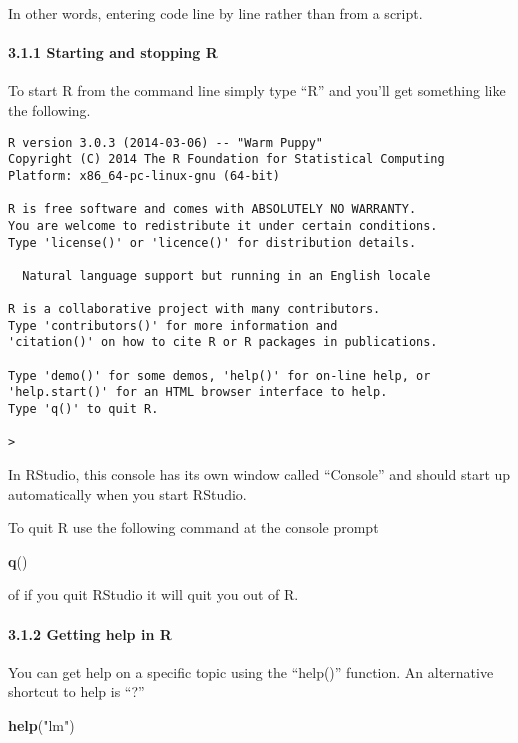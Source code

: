 \documentclass[]{article}
\newenvironment{Shaded}{}{}
\newcommand{\KeywordTok}[1]{\textcolor[rgb]{0.00,0.44,0.13}{\textbf{{#1}}}}
\newcommand{\StringTok}[1]{\textcolor[rgb]{0.25,0.44,0.63}{{#1}}}
\newcommand{\NormalTok}[1]{{#1}}
\begin{document}
In other words, entering code line by line rather than from a script.

\paragraph{3.1.1 Starting and stopping R}

To start R from the command line simply type ``R'' and you'll get
something like the following.

\begin{verbatim}
R version 3.0.3 (2014-03-06) -- "Warm Puppy"
Copyright (C) 2014 The R Foundation for Statistical Computing
Platform: x86_64-pc-linux-gnu (64-bit)

R is free software and comes with ABSOLUTELY NO WARRANTY.
You are welcome to redistribute it under certain conditions.
Type 'license()' or 'licence()' for distribution details.

  Natural language support but running in an English locale

R is a collaborative project with many contributors.
Type 'contributors()' for more information and
'citation()' on how to cite R or R packages in publications.

Type 'demo()' for some demos, 'help()' for on-line help, or
'help.start()' for an HTML browser interface to help.
Type 'q()' to quit R.

>
\end{verbatim}

In RStudio, this console has its own window called ``Console'' and
should start up automatically when you start RStudio.

To quit R use the following command at the console prompt

\begin{Shaded}
\begin{Highlighting}[]
\KeywordTok{q}\NormalTok{()}
\end{Highlighting}
\end{Shaded}

of if you quit RStudio it will quit you out of R.

\paragraph{3.1.2 Getting help in R}

You can get help on a specific topic using the ``help()'' function. An
alternative shortcut to help is ``?''

\begin{Shaded}
\begin{Highlighting}[]

\KeywordTok{help}\NormalTok{(}\StringTok{"lm"}\NormalTok{)}
\end{Highlighting}
\end{Shaded}
\end{document}
